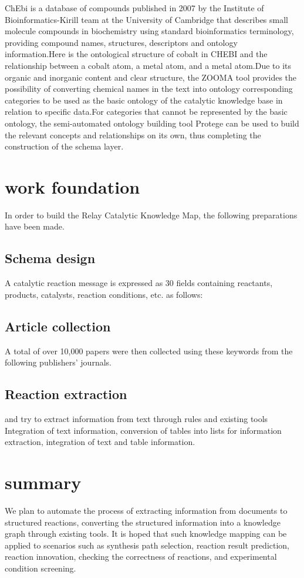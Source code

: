 \documentclass[%
 aip,
 jmp,%
 amsmath,amssymb,
 reprint,%
]{revtex4-2}
\begin{document}
ChEbi is a database of compounds published in 2007 by the Institute of Bioinformatics-Kirill team at the University of Cambridge that 
describes small molecule compounds in biochemistry using standard bioinformatics terminology, providing compound names, structures, 
descriptors and ontology information.Here is the ontological structure of cobalt in CHEBI and the relationship between a cobalt atom, 
a metal atom, and a metal atom.Due to its organic and inorganic content and clear structure, the ZOOMA tool provides the possibility 
of converting chemical names in the text into ontology corresponding categories to be used as the basic ontology of the catalytic 
knowledge base in relation to specific data.For categories that cannot be represented by the basic ontology, the semi-automated ontology 
building tool Protege can be used to build the relevant concepts and relationships on its own, thus completing the construction of the 
schema layer.

\section{work foundation}
In order to build the Relay Catalytic Knowledge Map, the following preparations have been made.

\subsection{Schema design}
A catalytic reaction message is expressed as 30 fields containing reactants, products, catalysts, reaction conditions, etc. as follows:

\subsection{Article collection}
A total of over 10,000 papers were then collected using these keywords from the following publishers' journals.

\subsection{Reaction extraction}
and try to extract information from text through rules and existing tools
Integration of text information, conversion of tables into lists for information extraction, integration of text and table information.

\section{summary}
We plan to automate the process of extracting information from documents to structured reactions, converting the structured information 
into a knowledge graph through existing tools. It is hoped that such knowledge mapping can be applied to scenarios such as synthesis path
selection, reaction result prediction, reaction innovation, checking the correctness of reactions, and experimental condition screening.
\end{document}
